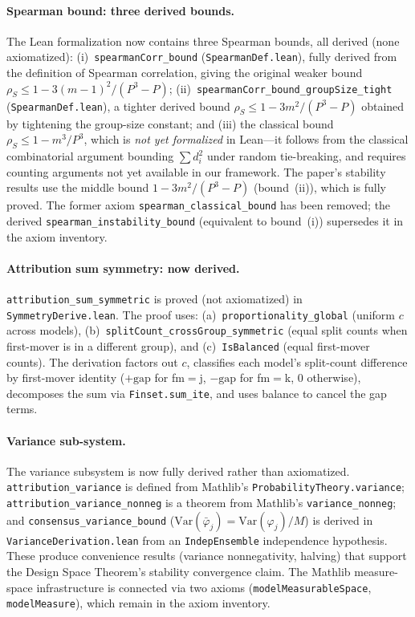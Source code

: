 \documentclass{article}
\newcommand{\Var}{\mathrm{Var}}
\begin{document}
\begin{sloppypar}
\paragraph{Spearman bound: three derived bounds.}
The Lean formalization now contains three Spearman bounds, all derived
(none axiomatized):
(i)~\texttt{spearmanCorr\_bound} (\texttt{SpearmanDef.lean}),
fully derived from the definition of Spearman correlation, giving the
original weaker bound $\rho_S \leq 1 - 3(m{-}1)^2/(P^3 - P)$;
(ii)~\texttt{spearmanCorr\_bound\_groupSize\_tight}
(\texttt{SpearmanDef.lean}), a tighter derived bound
$\rho_S \leq 1 - 3m^2/(P^3 - P)$ obtained by tightening the
group-size constant; and
(iii) the classical bound $\rho_S \leq 1 - m^3/P^3$, which is
\emph{not yet formalized} in Lean---it follows from the classical
combinatorial argument bounding $\sum d_i^2$ under random tie-breaking,
and requires counting arguments not yet available in our framework.
The paper's stability results use the middle bound
$1 - 3m^2/(P^3 - P)$ (bound~(ii)), which is fully proved.
The former axiom \texttt{spearman\_classical\_bound} has been removed;
the derived \texttt{spearman\_instability\_bound} (equivalent to
bound~(i)) supersedes it in the axiom inventory.

\paragraph{Attribution sum symmetry: now derived.}
\texttt{attribution\_sum\_symmetric} is proved (not axiomatized) in
\texttt{SymmetryDerive.lean}. The proof uses:
(a)~\texttt{proportionality\_global} (uniform $c$ across models),
(b)~\texttt{splitCount\_crossGroup\_symmetric} (equal split counts
when first-mover is in a different group), and
(c)~\texttt{IsBalanced} (equal first-mover counts).
The derivation factors out $c$, classifies each model's split-count
difference by first-mover identity ($+\text{gap}$ for fm$=$j,
$-\text{gap}$ for fm$=$k, $0$ otherwise), decomposes the sum via
\texttt{Finset.sum\_ite}, and uses balance to cancel the gap terms.

\paragraph{Variance sub-system.}
The variance subsystem is now fully derived rather than axiomatized.
\texttt{attribution\_variance} is defined from Mathlib's
\texttt{ProbabilityTheory.variance}; \texttt{attribution\_variance\_nonneg}
is a theorem from Mathlib's \texttt{variance\_nonneg}; and
\texttt{consensus\_variance\_bound} ($\Var(\bar\varphi_j) = \Var(\varphi_j)/M$)
is derived in \texttt{VarianceDerivation.lean} from an \texttt{IndepEnsemble}
independence hypothesis. These produce convenience results (variance
nonnegativity, halving) that support the Design Space Theorem's
stability convergence claim. The Mathlib measure-space infrastructure
is connected via two axioms (\texttt{modelMeasurableSpace},
\texttt{modelMeasure}), which remain in the axiom inventory.
\end{sloppypar}
\end{document}
